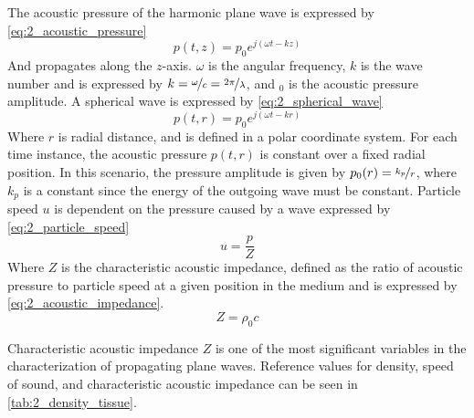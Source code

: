 The acoustic pressure of the harmonic plane wave is expressed by \cref{eq:2_acoustic_pressure}
\begin{equation} \label{eq:2_acoustic_pressure}
	p(t,z)=p_{0} e^{j(\omega t - k z)}
\end{equation}
And propagates along the $z$-axis. $\omega$ is the angular frequency, $k$ is the wave number and is expressed by $k=\nicefrac{\omega}{c}=\nicefrac{2\pi}{\lambda}$, and $_{0}$ is the acoustic pressure amplitude. A spherical wave is expressed by \cref{eq:2_spherical_wave}
\begin{equation} \label{eq:2_spherical_wave}
	p(t,r)=p_{0} e^{j(\omega t - k r)}
\end{equation}
Where $r$ is radial distance, and is defined in a polar coordinate system. For each time instance, the acoustic pressure $p(t,r)$ is constant over a fixed radial position. In this scenario, the pressure amplitude is given by $p_{0}(r) = \nicefrac{k_{p}}{r}$, where $k_{p}$ is a constant since the energy of the outgoing wave must be constant.  Particle speed $u$ is dependent on the pressure caused by a wave expressed by \cref{eq:2_particle_speed}
\begin{equation} \label{eq:2_particle_speed}
	u = \frac{p}{Z}
\end{equation}
Where $Z$ is the characteristic acoustic impedance, defined as the ratio of acoustic pressure to particle speed at a given position in the medium and is expressed by \cref{eq:2_acoustic_impedance}.
\begin{equation} \label{eq:2_acoustic_impedance}
	Z = \rho_{0} c
\end{equation}

Characteristic acoustic impedance $Z$ is one of the most significant variables in the characterization of propagating plane waves. Reference values for density, speed of sound, and characteristic acoustic impedance can be seen in \cref{tab:2_density_tissue}.

